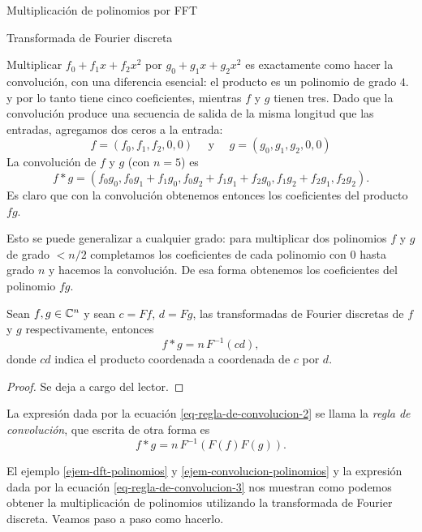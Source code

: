 \begin{chapter}{Multiplicación de polinomios por FFT}
\begin{section}{Transformada de Fourier discreta}
\begin{ejemplo}
        Multiplicar $f_0 + f_1x + f_2x^2$ por $g_0 + g_1x + g_2x^2$ es exactamente como hacer la convolución, con una diferencia esencial: el producto es un polinomio de grado $4$. y por lo tanto tiene cinco coeficientes, mientras $f$ y $g$ tienen tres. Dado que la convolución produce una secuencia de salida de la misma longitud que las entradas, agregamos dos ceros a la entrada:
        \begin{equation*}
            f = (f_0,f_1,f_2,0,0) \quad \text{ y }\quad g = (g_0,g_1,g_2,0,0)
        \end{equation*}
        La convolución de $f$ y $g$ (con $n = 5$) es
        \begin{equation*}
            f * g = (f_0g_0, f_0g_1 + f_1g_0 , f_0g_2 + f_1g_1+ f_2g_0, f_1g_2 + f_2g_1, f_2g_2 ).
        \end{equation*}
        Es claro que con la convolución obtenemos entonces  los coeficientes del producto $fg$.

        Esto se puede generalizar a cualquier grado:  para multiplicar dos polinomios $f$ y $g$ de grado $<n/2$ completamos los coeficientes de cada polinomio  con $0$ hasta grado $n$ y hacemos la convolución. De esa forma obtenemos los coeficientes del polinomio $fg$.
    \end{ejemplo}


    \begin{teorema}\label{th-prod-convolucion-dft}
        Sean $f,g \in \mathbb C^n$ y  sean $c= Ff$, $d = Fg$, las transformadas de Fourier discretas de $f$ y $g$ respectivamente, entonces
        \begin{equation}\label{eq-regla-de-convolucion-2}
            f * g = n\,  F^{-1}(cd),
        \end{equation}
        donde $cd$  indica el producto coordenada a coordenada de $c$ por $d$.
    \end{teorema}
    \begin{proof}
        Se deja a cargo del lector.
    \end{proof}

    La expresión dada por la ecuación  \eqref{eq-regla-de-convolucion-2} se llama la  \textit{regla de convolución},  que escrita de otra forma es
    \begin{equation}\label{eq-regla-de-convolucion-3}
      f * g = n\,  F^{-1}(F(f)F(g)).
      \end{equation}
    \begin{ejemplo*} El ejemplo \ref{ejem-dft-polinomios} y \ref{ejem-convolucion-polinomios} y  la expresión dada por la ecuación  \eqref{eq-regla-de-convolucion-3} nos  muestran como podemos obtener  la multiplicación de polinomios utilizando la transformada de Fourier discreta. Veamos paso a paso como hacerlo.


\end{ejemplo*}
\end{section}
\end{chapter}
